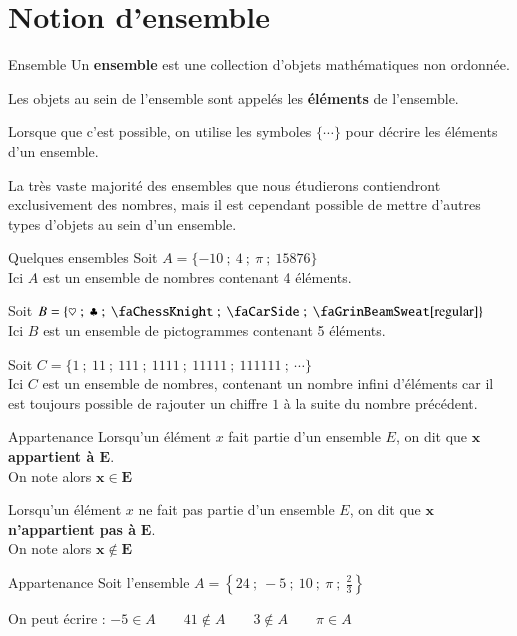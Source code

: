 \documentclass[oneside,12pt]{article}          %
\begin{document}
\section{Notion d'ensemble}

\begin{definition}{Ensemble}
	Un \textbf{ensemble} est une collection d'objets mathématiques non ordonnée.
	
	Les objets au sein de l'ensemble sont appelés les \textbf{éléments} de l'ensemble. 
	
	Lorsque que c'est possible, on utilise les symboles $\{\cdots\}$ pour décrire les éléments d'un ensemble.
\end{definition}

La très vaste majorité des ensembles que nous étudierons contiendront exclusivement des nombres, mais il est cependant possible de mettre d'autres types d'objets au sein d'un ensemble.

\begin{exemple}{Quelques ensembles}
	Soit $A=\{-10~;~4~;~\pi~;~15876\}$\\
	Ici $A$ est un ensemble de nombres contenant 4 éléments.

	Soit $B=\{ \heartsuit ~;~ \clubsuit~;~ \text{\faChessKnight}~;~ \text{\faCarSide}~;~ \text{\faGrinBeamSweat[regular]} \}$ \\
	Ici $B$ est un ensemble de pictogrammes contenant 5 éléments.
	
	Soit $C=\{1~;~ 11~;~ 111~;~ 1111~;~ 11111~;~ 111111~;~ \cdots\}$ \\
	Ici $C$ est un ensemble de nombres, contenant un nombre infini d'éléments car il est toujours possible de rajouter un chiffre $1$ à la suite du nombre précédent.
\end{exemple}



\begin{definition}{Appartenance}
	Lorsqu'un élément $x$ fait partie d'un ensemble $E$, on dit que \textbf{$\mathbold x$ appartient à $\mathbold E$}.\\
	On note alors $\mathbold{x\in E}$
	
	Lorsqu'un élément $x$ ne fait pas partie d'un ensemble $E$, on dit que $\mathbold x$ \textbf{n'appartient pas à} $\mathbold E$.\\
	On note alors $\mathbold{x\notin E}$
\end{definition}

\begin{exemple}{Appartenance}
	Soit l'ensemble $A=\left\{24~;~-5~;~10~;~\pi~;~\frac{2}{3}\right\}$

	On peut écrire : $-5\in A \qquad 41\notin A \qquad 3\notin A \qquad \pi\in A$
\end{exemple}
\end{document}

